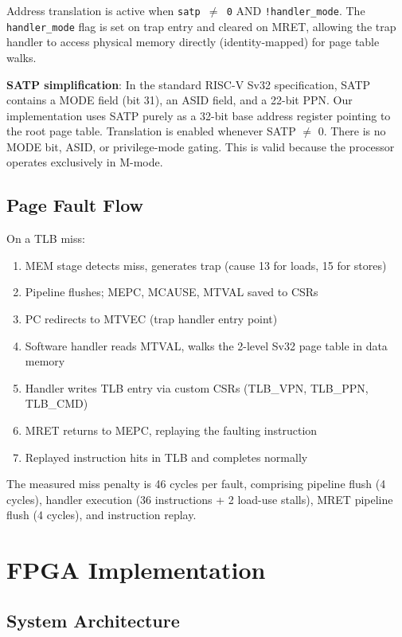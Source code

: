 \documentclass[conference]{IEEEtran}
\begin{document}
Address translation is active when \texttt{satp $\neq$ 0} AND \texttt{!handler\_mode}. The \texttt{handler\_mode} flag is set on trap entry and cleared on MRET, allowing the trap handler to access physical memory directly (identity-mapped) for page table walks.

\textbf{SATP simplification}: In the standard RISC-V Sv32 specification, SATP contains a MODE field (bit 31), an ASID field, and a 22-bit PPN. Our implementation uses SATP purely as a 32-bit base address register pointing to the root page table. Translation is enabled whenever SATP $\neq$ 0. There is no MODE bit, ASID, or privilege-mode gating. This is valid because the processor operates exclusively in M-mode.

\subsection{Page Fault Flow}

On a TLB miss:
\begin{enumerate}
    \item MEM stage detects miss, generates trap (cause 13 for loads, 15 for stores)
    \item Pipeline flushes; MEPC, MCAUSE, MTVAL saved to CSRs
    \item PC redirects to MTVEC (trap handler entry point)
    \item Software handler reads MTVAL, walks the 2-level Sv32 page table in data memory
    \item Handler writes TLB entry via custom CSRs (TLB\_VPN, TLB\_PPN, TLB\_CMD)
    \item MRET returns to MEPC, replaying the faulting instruction
    \item Replayed instruction hits in TLB and completes normally
\end{enumerate}

The measured miss penalty is 46 cycles per fault, comprising pipeline flush (4 cycles), handler execution (36 instructions + 2 load-use stalls), MRET pipeline flush (4 cycles), and instruction replay.

\section{FPGA Implementation}

\subsection{System Architecture}
\end{document}
